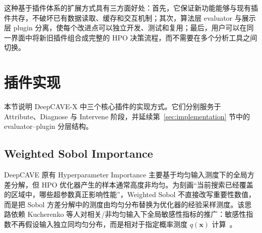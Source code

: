 \documentclass[11pt,a4paper]{ctexart}
\begin{document}
这种基于插件体系的扩展方式具有三方面好处：首先，它保证新功能能够与现有插件共存，不破坏已有数据读取、缓存和交互机制；其次，算法层 evaluator 与展示层 plugin 分离，使每个改进点可以独立开发、测试和复用；最后，用户可以在同一界面中将新旧插件组合成完整的 HPO 决策流程，而不需要在多个分析工具之间切换。


\section{插件实现}

本节说明 DeepCAVE-X 中三个核心插件的实现方式。它们分别服务于 Attribute、Diagnose 与 Intervene 阶段，并延续第~\ref{sec:implementation} 节中的 evaluator--plugin 分层结构。

\subsection{Weighted Sobol Importance}
\label{sec:weighted-sobol}

DeepCAVE 原有 Hyperparameter Importance 主要基于均匀输入测度下的全局方差分解，但 HPO 优化器产生的样本通常高度非均匀。为刻画``当前搜索已经覆盖的区域中，哪些超参数真正影响性能''，Weighted Sobol 不直接改写重要性数值，而是把 Sobol 方差分解中的测度由均匀分布替换为优化器的经验采样测度。该思路依赖 Kucherenko 等人对相关/非均匀输入下全局敏感性指标的推广：敏感性指数不再假设输入独立同均匀分布，而是相对于指定概率测度 $q(\mathbf{x})$ 计算~\cite{kucherenko2012dependent}。
\end{document}
